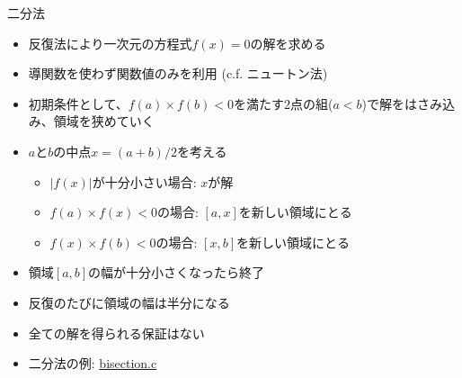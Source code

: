 \begin{frame}[t,fragile]{二分法}
  \begin{itemize}
  \item 反復法により一次元の方程式$f(x)=0$の解を求める
  \item 導関数を使わず関数値のみを利用 (c.f. ニュートン法)
  \item 初期条件として、$f(a) \times f(b) < 0$を満たす2点の組($a<b$)で解をはさみ込み、領域を狭めていく
  \item $a$と$b$の中点$x=(a+b)/2$を考える
    \begin{itemize}
    \item $|f(x)|$が十分小さい場合: $x$が解
    \item $f(a) \times f(x) < 0$の場合: $[a,x]$を新しい領域にとる
    \item $f(x) \times f(b) < 0$の場合: $[x,b]$を新しい領域にとる
    \end{itemize}
  \item 領域$[a,b]$の幅が十分小さくなったら終了
  \item 反復のたびに領域の幅は半分になる
  \item 全ての解を得られる保証はない
  \item 二分法の例: \href{https://github.com/todo-group/computer-experiments/blob/master/exercise/basics/bisection.c}{bisection.c}
  \end{itemize}
\end{frame}
